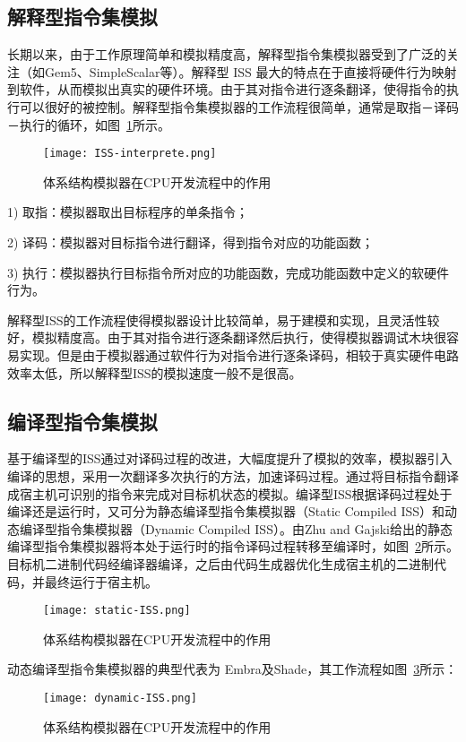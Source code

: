\subsection{解释型指令集模拟}
长期以来，由于工作原理简单和模拟精度高，解释型指令集模拟器受到了广泛的关注（如Gem5、SimpleScalar等）。解释型 ISS 最大的特点在于直接将硬件行为映射到软件\cite{jump}，从而模拟出真实的硬件环境。由于其对指令进行逐条翻译，使得指令的执行可以很好的被控制。解释型指令集模拟器的工作流程很简单，通常是取指－译码－执行的循环，如图~\ref{fig:ISS-interprete}所示。
\begin{figure}[h]
  \centering
  \texttt{[image: ISS-interprete.png]}
  \caption{体系结构模拟器在CPU开发流程中的作用}
  \label{fig:ISS-interprete}
\end{figure}


1) 取指：模拟器取出目标程序的单条指令；


2) 译码：模拟器对目标指令进行翻译，得到指令对应的功能函数； 


3) 执行：模拟器执行目标指令所对应的功能函数，完成功能函数中定义的软硬件行为。


解释型ISS的工作流程使得模拟器设计比较简单，易于建模和实现，且灵活性较好，模拟精度高。由于其对指令进行逐条翻译然后执行，使得模拟器调试木块很容易实现。但是由于模拟器通过软件行为对指令进行逐条译码，相较于真实硬件电路效率太低，所以解释型ISS的模拟速度一般不是很高。


\subsection{编译型指令集模拟}
基于编译型的ISS通过对译码过程的改进，大幅度提升了模拟的效率，模拟器引入编译的思想，采用一次翻译多次执行的方法，加速译码过程。通过将目标指令翻译成宿主机可识别的指令来完成对目标机状态的模拟。编译型ISS根据译码过程处于编译还是运行时，又可分为静态编译型指令集模拟器（Static Compiled ISS）和动态编译型指令集模拟器（Dynamic Compiled ISS）。由Zhu and Gajski\cite{zhu1999retargetable}给出的静态编译型指令集模拟器将本处于运行时的指令译码过程转移至编译时，如图~\ref{fig:static-ISS}所示。目标机二进制代码经编译器编译，之后由代码生成器优化生成宿主机的二进制代码，并最终运行于宿主机。
\begin{figure}[h]
  \centering
  \texttt{[image: static-ISS.png]}
  \caption{体系结构模拟器在CPU开发流程中的作用}
  \label{fig:static-ISS}
\end{figure}


动态编译型指令集模拟器的典型代表为 Embra\cite{witchel1996embra}及Shade\cite{cmelik1995shade}，其工作流程如图~\ref{fig:dynamic-ISS}所示：
\begin{figure}[h]
  \centering
  \texttt{[image: dynamic-ISS.png]}
  \caption{体系结构模拟器在CPU开发流程中的作用}
  \label{fig:dynamic-ISS}
\end{figure}


